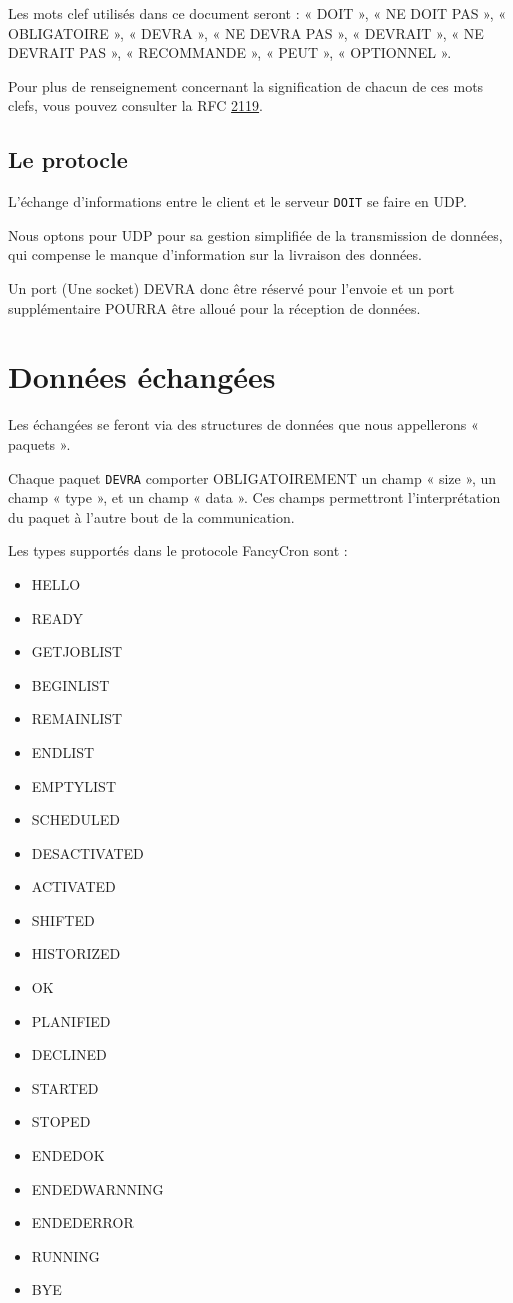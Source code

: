 \documentclass{bouygues-fr}
\begin{document}
Les mots clef utilisés dans ce document seront :
« DOIT », « NE DOIT PAS », « OBLIGATOIRE », « DEVRA »,
« NE DEVRA PAS », « DEVRAIT », « NE DEVRAIT PAS », « RECOMMANDE », « PEUT », « OPTIONNEL ».

Pour plus de renseignement concernant la signification de chacun de ces mots clefs, vous pouvez consulter la RFC \href{http://www.ietf.org/rfc/rfc2119.txt}{2119}.

\vspace{20pt}
\section{Le protocle}

L'échange d'informations entre le client et le serveur \texttt{DOIT} se faire en UDP.

Nous optons pour UDP pour sa gestion simplifiée de la transmission de données, qui compense le manque d'information sur la livraison des données.

Un port (Une socket) DEVRA donc être réservé pour l’envoie et un port supplémentaire POURRA être alloué pour la réception de données.

\vspace{20pt}
\chapter{Données échangées}

Les échangées se feront via des structures de données que nous appellerons « paquets ».

Chaque paquet \texttt{DEVRA} comporter OBLIGATOIREMENT un champ « size », un champ « type », et un champ « data ». Ces champs permettront l’interprétation du paquet à l'autre bout de  la communication.
 
Les types supportés dans le protocole FancyCron sont :
\begin{itemize}
\item HELLO
\item READY
\item GETJOBLIST
\item BEGINLIST
\item REMAINLIST
\item ENDLIST
\item EMPTYLIST
\item SCHEDULED
\item DESACTIVATED
\item ACTIVATED
\item SHIFTED
\item HISTORIZED
\item OK
\item PLANIFIED
\item DECLINED
\item STARTED
\item STOPED
\item ENDEDOK
\item ENDEDWARNNING
\item ENDEDERROR
\item RUNNING
\item BYE
\end{itemize}
\end{document}
